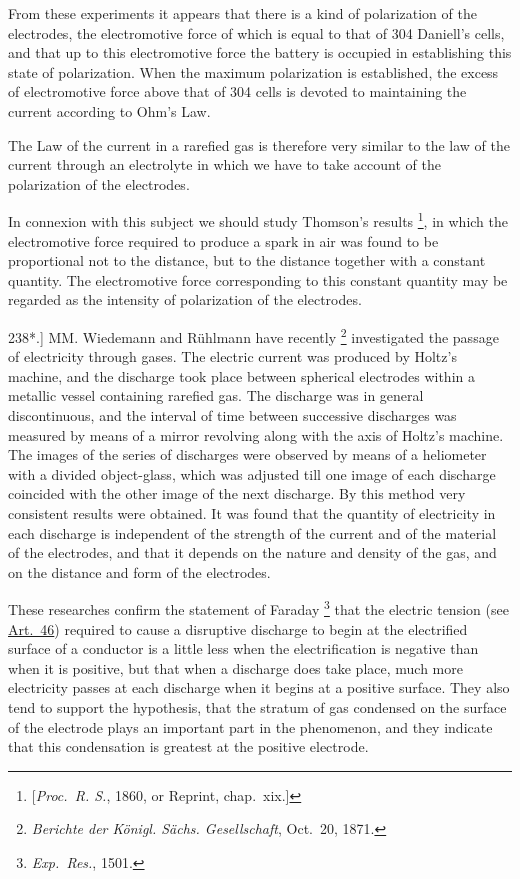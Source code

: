 \documentclass[12pt,oneside]{book}[2021/10/04]
\let\oldfootnote\footnote
\renewcommand\footnote[1]{%
\oldfootnote{\hspace{0.14em}#1}}
\newcommand{\article}[1]{\phantomsection \label{art:#1}{#1.]}}
\newcommand{\¬}{\hphantom{0}}
\begin{document}
From these experiments it appears that there is a kind of
polarization of the electrodes, the electromotive force of which
is equal to that of 304 Daniell's cells, and that up to this electromotive
force the battery is occupied in establishing this state of
polarization. When the maximum polarization is established, the
excess of electromotive force above that of 304 cells is devoted to
maintaining the current according to Ohm's Law.

The Law of the current in a rarefied gas is therefore very similar
to the law of the current through an electrolyte in which we have
to take account of the polarization of the electrodes.

In connexion with this subject we should study Thomson's results\footnote
{[\textit{Proc.\ R. S.}, 1860, or Reprint, chap.\ xix.]},
in which the electromotive force required to produce a spark
in air was found to be proportional not to the distance, but to the
distance together with a constant quantity. The electromotive
force corresponding to this constant quantity may be regarded as
the intensity of polarization of the electrodes.

\article{238*} MM. Wiedemann and Rühlmann have recently\footnote{
\textit{Berichte der Königl. Sächs. Gesellschaft}, Oct.\ 20, 1871.} investigated
the passage of electricity through gases. The electric current
was produced by Holtz's machine, and the discharge took place
between spherical electrodes within a metallic vessel containing
rarefied gas. The discharge was in general discontinuous, and the
interval of time between successive discharges was measured by
means of a mirror revolving along with the axis of Holtz's machine.
The images of the series of discharges were observed by means of
a heliometer with a divided object-glass, which was adjusted till
one image of each discharge coincided with the other image of
the next discharge. By this method very consistent results were
obtained. It was found that the quantity of electricity in each
discharge is independent of the strength of the current and of
the material of the electrodes, and that it depends on the nature
and density of the gas, and on the distance and form of the
electrodes.

These researches confirm the statement of Faraday\footnote{
\textit{Exp.\ Res.}, 1501.} that the
electric tension (see \hyperref[art:46]{Art.\ 46}) required to cause a disruptive discharge
to begin at the electrified surface of a conductor is a little less
when the electrification is negative than when it is positive, but
that when a discharge does take place, much more electricity passes
at each discharge when it begins at a positive surface. They also
tend to support the hypothesis, that the stratum of gas condensed
on the surface of the electrode plays an important part in the
phenomenon, and they indicate that this condensation is greatest
at the positive electrode.
\end{document}
